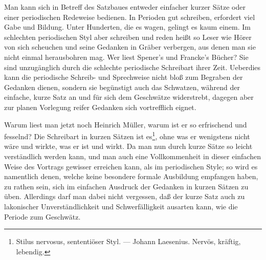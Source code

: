 Man kann sich in Betreff des Satzbaues entweder einfacher kurzer Sätze oder einer periodischen Redeweise bedienen. In Perioden gut schreiben, erfordert viel Gabe und Bildung. Unter Hunderten, die es wagen, gelingt es kaum einem. Im schlechten periodischen Styl aber schreiben und reden heißt so Leser wie Hörer von sich scheuchen und seine Gedanken in Gräber verbergen, aus denen man sie nicht einmal herausbohren mag. Wer liest Spener’s und Francke’s Bücher? Sie sind unzugänglich durch die schlechte periodische Schreibart ihrer Zeit. Ueberdies kann die periodische Schreib- und Sprechweise nicht bloß zum Begraben der Gedanken dienen, sondern sie begünstigt auch das Schwatzen, während der einfache, kurze Satz an und für sich dem Geschwätze widerstrebt, dagegen aber zur planen Vorlegung reifer Gedanken sich vortrefflich eignet.

Warum liest man jetzt noch Heinrich Müller, warum ist er so erfrischend und fesselnd? Die Schreibart in kurzen Sätzen ist es\footnote{Stilus nervosus, sententiöser Styl. — Johann Laesenius. Nervös, kräftig, lebendig.}, ohne was er wenigstens nicht wäre und wirkte, was er ist und wirkt. Da man nun durch kurze Sätze so leicht verständlich werden kann, und man auch eine Vollkommenheit in dieser einfachen Weise des Vortrags gewisser erreichen kann, als im periodischen Style; so wird es namentlich denen, welche keine besondere formale Ausbildung empfangen haben, zu rathen sein, sich im einfachen Ausdruck der Gedanken in kurzen Sätzen zu üben. Allerdings darf man dabei nicht vergessen, daß der kurze Satz auch zu lakonischer Unverständlichkeit und Schwerfälligkeit ausarten kann, wie die Periode zum Geschwätz.

